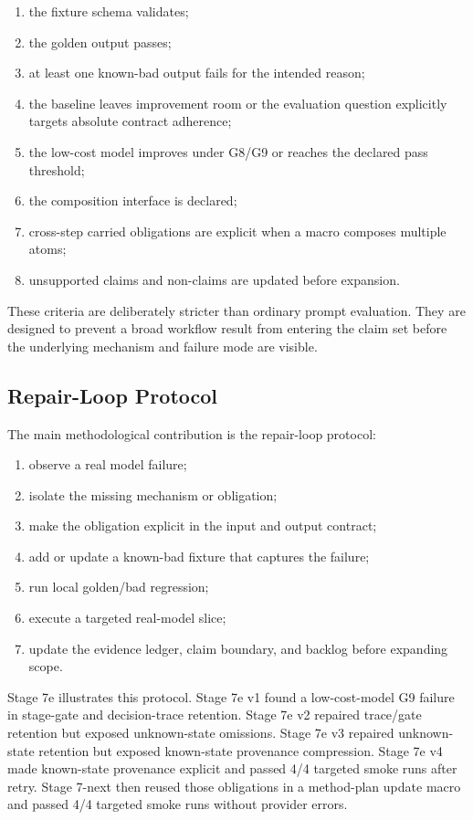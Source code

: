 \documentclass[11pt]{article}
\begin{document}
\begin{enumerate}
\item the fixture schema validates;
\item the golden output passes;
\item at least one known-bad output fails for the intended reason;
\item the baseline leaves improvement room or the evaluation question explicitly targets absolute contract adherence;
\item the low-cost model improves under G8/G9 or reaches the declared pass threshold;
\item the composition interface is declared;
\item cross-step carried obligations are explicit when a macro composes multiple atoms;
\item unsupported claims and non-claims are updated before expansion.
\end{enumerate}

These criteria are deliberately stricter than ordinary prompt evaluation. They are designed to prevent a broad workflow result from entering the claim set before the underlying mechanism and failure mode are visible.

\subsection{Repair-Loop Protocol}

The main methodological contribution is the repair-loop protocol:

\begin{enumerate}
\item observe a real model failure;
\item isolate the missing mechanism or obligation;
\item make the obligation explicit in the input and output contract;
\item add or update a known-bad fixture that captures the failure;
\item run local golden/bad regression;
\item execute a targeted real-model slice;
\item update the evidence ledger, claim boundary, and backlog before expanding scope.
\end{enumerate}

Stage 7e illustrates this protocol. Stage 7e v1 found a low-cost-model G9 failure in stage-gate and decision-trace retention. Stage 7e v2 repaired trace/gate retention but exposed unknown-state omissions. Stage 7e v3 repaired unknown-state retention but exposed known-state provenance compression. Stage 7e v4 made known-state provenance explicit and passed 4/4 targeted smoke runs after retry. Stage 7-next then reused those obligations in a method-plan update macro and passed 4/4 targeted smoke runs without provider errors.
\end{document}
